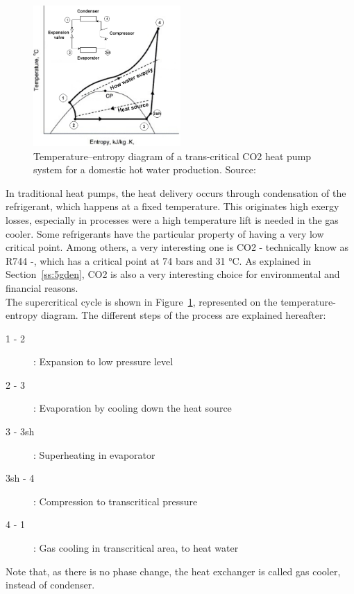 \documentclass{article}
\begin{document}
\begin{figure}[htp]
	\centering
	\includegraphics[width=0.5\textwidth]{HP_cylce_CO2.png}
	\caption{Temperature–entropy diagram of a trans-critical CO2 heat pump system for a domestic hot water production. Source:~\cite{kimPerformanceTranscriticalCO22005}}
	\label{fig:hp_CO2}
\end{figure}

In traditional heat pumps, the heat delivery occurs through condensation of the refrigerant, which happens at a fixed temperature. This originates high exergy losses, especially in processes were a high temperature lift is needed in the gas cooler. Some refrigerants have the particular property of having a very low critical point. Among others, a very interesting one is CO2 - technically know as R744 -, which has a critical point at 74 bars and 31 \si{\celsius}\cite{cavalliniPropertiesCO2Refrigerant2004}. As explained in Section~\ref{ss:5gden}, CO2 is also a very interesting choice for environmental and financial reasons.\\

The supercritical cycle is shown in Figure~\ref{fig:hp_CO2}, represented on the temperature-entropy diagram. The different steps of the process are explained hereafter: 
\begin{description}
\item [1 - 2]: Expansion to low pressure level
\item [2 - 3]: Evaporation by cooling down the heat source
\item [3 - 3sh]: Superheating in evaporator
\item [3sh - 4]: Compression to transcritical pressure
\item [4 - 1]: Gas cooling in transcritical area, to heat water
\end{description}
Note that, as there is no phase change, the heat exchanger is called gas cooler, instead of condenser.\\
\end{document}
